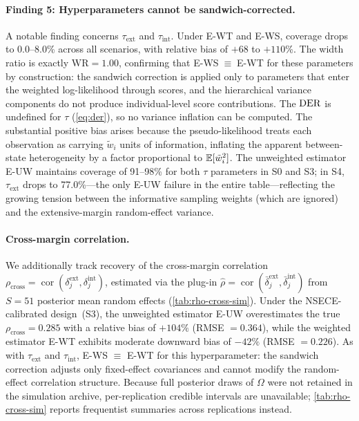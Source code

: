\paragraph{Finding 5: Hyperparameters cannot be sandwich-corrected.}
A notable finding concerns $\tau_{\mathrm{ext}}$ and
$\tau_{\mathrm{int}}$. Under E-WT and E-WS, coverage drops to
0.0--8.0\% across all scenarios, with relative bias of
$+68$ to $+110$\%. The width ratio is exactly $\mathrm{WR} = 1.00$,
confirming that E-WS$\;\equiv\;$E-WT for these parameters by
construction: the sandwich correction is applied only to parameters
that enter the weighted log-likelihood through scores, and the
hierarchical variance components do not produce individual-level score
contributions. The $\operatorname{DER}$ is undefined for $\tau$
(\cref{eq:der}), so no variance inflation can be computed. The
substantial positive bias arises because the pseudo-likelihood treats
each observation as carrying $\tilde{w}_i$ units of information,
inflating the apparent between-state heterogeneity by a factor
proportional to $\mathbb{E}[\tilde{w}_i^2]$. The unweighted estimator
E-UW maintains coverage of 91--98\% for both
$\tau$ parameters in S0 and S3; in S4,
$\tau_{\mathrm{ext}}$ drops to 77.0\%---the only E-UW
failure in the entire table---reflecting the growing tension between
the informative sampling weights (which are ignored) and the
extensive-margin random-effect variance.

\paragraph{Cross-margin correlation.}
We additionally track recovery of the cross-margin correlation
$\rho_{\mathrm{cross}} = \operatorname{cor}(\delta_j^{\mathrm{ext}},
\delta_j^{\mathrm{int}})$, estimated via the plug-in
$\hat{\rho} = \operatorname{cor}(\bar{\delta}_j^{\mathrm{ext}},
\bar{\delta}_j^{\mathrm{int}})$ from $S = 51$ posterior mean random
effects (\cref{tab:rho-cross-sim}).
Under the NSECE-calibrated design~(S3), the unweighted estimator E-UW
overestimates the true $\rho_{\mathrm{cross}} = 0.285$ with a relative
bias of $+104\%$ (RMSE $= 0.364$), while the weighted estimator E-WT
exhibits moderate downward bias of $-42\%$ (RMSE $= 0.226$).
As with $\tau_{\mathrm{ext}}$ and $\tau_{\mathrm{int}}$,
E-WS $\equiv$ E-WT for this hyperparameter: the sandwich correction
adjusts only fixed-effect covariances and cannot modify the
random-effect correlation structure.
Because full posterior draws of $\Omega$ were not retained in the
simulation archive, per-replication credible intervals are unavailable;
\cref{tab:rho-cross-sim} reports frequentist summaries across
replications instead.

